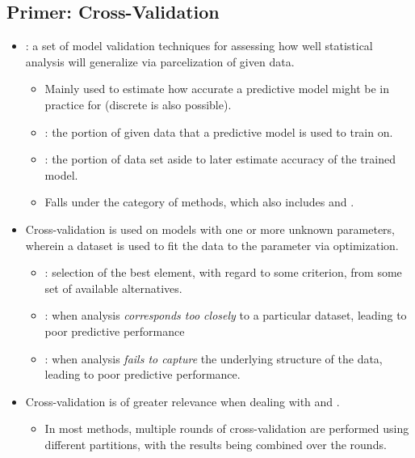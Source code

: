 \begin{itemize}
  \subsection{Primer: Cross-Validation}
    \begin{itemize}
    \item {}: a set of model validation techniques for assessing how well statistical analysis will generalize via parcelization of given data. 
      \begin{itemize}
        \item Mainly used to estimate how accurate a predictive model might be in practice for \hyperref[Subsection: Data Types]{} (discrete is also possible).
        \item {}: the portion of given data that a predictive model is used to train on. 
        \item {}: the portion of data set aside to later estimate accuracy of the trained model.
        \item Falls under the category of  methods, which also includes \hyperref[Subsection: Primer: Permutation Testing]{} and \hyperref[Subsection: Primer: Bootstrapping]{}.
      \end{itemize}
    \item Cross-validation is used on models with one or more unknown parameters, wherein a dataset is used to fit the data to the parameter via optimization.
      \begin{itemize}
        \item {}: selection of the best element, with regard to some criterion, from some set of available alternatives.
        \item {}: when analysis \emph{corresponds too closely} to a particular dataset, leading to poor predictive performance
        \item {}: when analysis \emph{fails to capture} the underlying structure of the data, leading to poor predictive performance.
      \end{itemize}
    \item Cross-validation is of greater relevance when dealing with \hyperref[Chapter: Regression]{} and \hyperref[Section: Confidence Intervals]{}.
      \begin{itemize}
        \item In most methods, multiple rounds of cross-validation are performed using different partitions, with the results being combined over the rounds.
      \end{itemize}
  \end{itemize}


\end{itemize}
